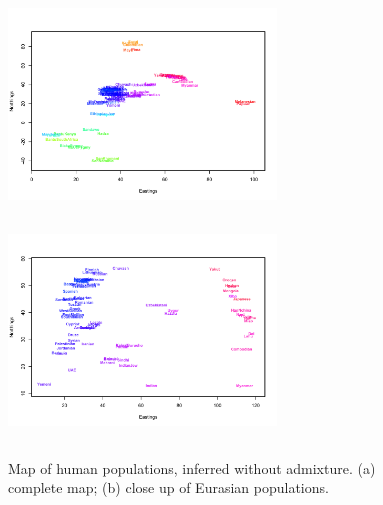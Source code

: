 \documentclass[12pt]{article}
\newcommand{\plrm}[1]{\todo[color=purple!20]{#1}}
\newcommand{\plrm}[1]{\plr{#1}}
\newcommand{\plr}[1]{{\it\color{purple}{(#1)}}}
\begin{document}
\begin{figure}
	\centering
			{\includegraphics[width=2.8in,height=2.3in]{figs/globetrotter/globe_NoAd_map.png}}
			{\includegraphics[width=2.8in,height=2.3in]{figs/globetrotter/globe_Eurasia_NoAd_map_indproc.png}}
	\caption{Map of human populations, inferred without admixture. (a) complete map; (b) close up of Eurasian 
populations.}\label{sfig:globe_noad_maps}
\end{figure}




\end{document}
